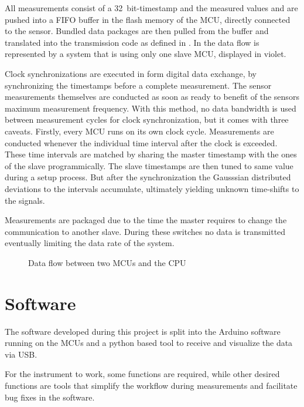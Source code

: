 All measurements consist of a \SI{32}{bit}-timestamp and the measured values and are pushed into a \ac{FIFO} buffer in the flash memory of the \ac{MCU}, directly connected to the sensor. Bundled data packages are then pulled from the buffer and translated into the transmission code as defined in . In  the data flow is represented by a system that is using only one slave \ac{MCU}, displayed in violet.

Clock synchronizations are executed in form digital data exchange, by synchronizing the timestamps before a complete measurement. The sensor measurements themselves are conducted as soon as ready to benefit of the sensors maximum measurement frequency. With this method, no data bandwidth is used between measurement cycles for clock synchronization, but it comes with three caveats. Firstly, every \ac{MCU} runs on its own clock cycle. Measurements are conducted whenever the individual time interval after the clock is exceeded. These time intervals are matched by sharing the master timestamp with the ones of the slave programmically. The slave timestamps are then tuned to same value during a setup process. But after the synchronization the Gausssian distributed deviations to the intervals accumulate, ultimately yielding unknown time-shifts to the signals.

Measurements are packaged due to the time the master requires to change the communication to another slave. During these switches no data is transmitted eventually limiting the data rate of the system.

\begin{figure}[!htb]
  \centering
  
  \caption[Data flow]{Data flow between two \ac{MCU}s and the CPU%
    \label{fig:data_flow}}
\end{figure}

\section{Software}

The software developed during this project is split into the Arduino software running on the \acs{MCU}s and a python based tool to receive and visualize the data via \ac{USB}.

For the instrument to work, some functions are required, while other desired functions are tools that simplify the workflow during measurements and facilitate bug fixes in the software.

